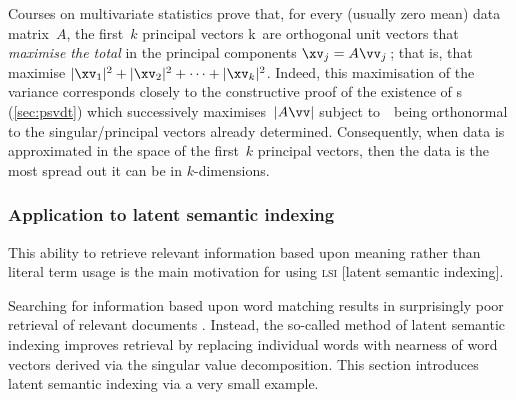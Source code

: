Courses on multivariate statistics prove that, for every (usually zero mean) data matrix~\(A\), the first~\(k\) principal vectors \hlist\vv k\ are orthogonal unit vectors that \emph{maximise the total } in the principal components \(\xv_j=A\vv_j\)\,; that is, that maximise \(|\xv_1|^2+|\xv_2|^2+\cdots+|\xv_k|^2\).
Indeed, this maximisation of the variance corresponds closely to the constructive proof of the existence of \svd{}s (\autoref{sec:psvdt}) which successively maximises~\(|A\vv|\) subject to~\vv\ being orthonormal to the singular\slash principal vectors already determined.
Consequently, when data is approximated in the space of the first~\(k\) principal vectors, then the data is the most spread out it can be in \(k\)-dimensions.







\subsubsection{Application to latent semantic indexing}
\label{sec:alsi}

\begin{quoted}{\cite[p.579]{Berry95}}
This ability to retrieve relevant information based upon meaning rather than literal term usage is the main motivation for using \textsc{lsi} [latent semantic indexing].
\end{quoted}

Searching for information based upon word matching results in surprisingly poor retrieval of relevant documents \cite[\S5.5]{Berry95}.
Instead, the so-called method of latent semantic indexing improves retrieval by replacing individual words with nearness of word vectors derived via the singular value decomposition.
This section introduces latent semantic indexing via a very small example. 


